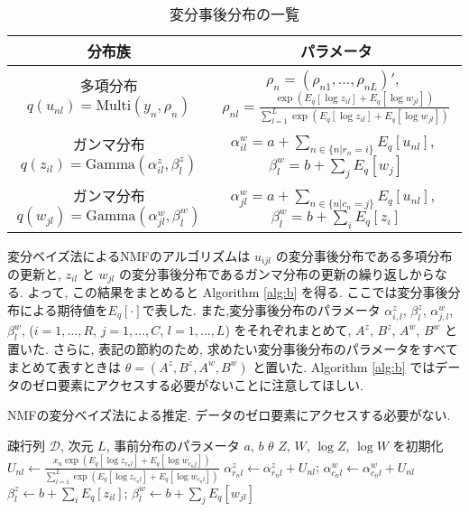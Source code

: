 \documentclass[paper=a4,10.5pt]{jsarticle} %
\numberwithin{equation}{section} %
\begin{document}
\renewcommand{\arraystretch}{1.6}
\begin{table}
\centering
\caption{変分事後分布の一覧} \label{post1}
\begin{tabular}{cc}
\hline
分布族 & パラメータ\\
\hline
多項分布 $q(u_{nl}) = \mathrm{Multi}(y_n, \rho_n)$ & $\rho_n = (\rho_{n1},\dots, \rho_{nL})'$,~ $\displaystyle \rho_{nl} = \frac{\exp(E_q[\log z_{il}] + E_q[\log w_{jl}] )}{ \sum_{l=1}^L \exp(E_q[\log z_{il}] + E_q[\log w_{jl}] )}$\\
ガンマ分布 $q(z_{il}) = \mathrm{Gamma}(\alpha^z_{il}, \beta^z_l)$ & $\displaystyle \alpha^w_{il}=a+\sum_{n \in \{n|r_n=i\}} E_q[u_{nl}]$,~ $\displaystyle \beta^w_{l} = b+\sum_j E_q[w_j]$\\
ガンマ分布 $q(w_{jl}) = \mathrm{Gamma}(\alpha^w_{jl}, \beta^w_{l})$ & $\displaystyle \alpha^w_{jl}=a+\sum_{n \in \{n|c_n=j\}} E_q[u_{nl}]$,~ $\displaystyle \beta^w_{l} = b+\sum_i E_q[z_i]$ \\
\hline
\end{tabular}
\end{table}
\renewcommand{\arraystretch}{1}

変分ベイズ法によるNMFのアルゴリズムは $u_{ijl}$ の変分事後分布である多項分布の更新と, $z_{il}$ と $w_{jl}$ の変分事後分布であるガンマ分布の更新の繰り返しからなる. よって, この結果をまとめると Algorithm \ref{alg:b} を得る. ここでは変分事後分布による期待値を$E_q[\cdot]$で表した. また,変分事後分布のパラメータ $\alpha^z_{i,l}$, $\beta^z_{l}$, $\alpha^w_{j,l}$, $\beta^w_{l}$, ($i=1,\ldots, R$, $j=1,\ldots, C$, $l=1, \ldots ,L$) をそれぞれまとめて, $A^z$, $B^z$, $A^w$, $B^w$ と置いた. さらに, 表記の節約のため, 求めたい変分事後分布のパラメータをすべてまとめて表すときは $\theta = (A^z, B^z, A^w, B^w)$ と置いた. Algorithm \ref{alg:b} ではデータのゼロ要素にアクセスする必要がないことに注意してほしい.

\begin{algorithm}[tbp]
\caption{NMFの変分ベイズ法による推定. データのゼロ要素にアクセスする必要がない. }\label{alg:b}
\begin{algorithmic}
\Require 疎行列 $\mathcal{D}$, 次元 $L$, 事前分布のパラメータ $a$, $b$
\Ensure $\theta$ 
\State $Z$, $W$, $\log Z$, $\log W$ を初期化  
 
    \State $\displaystyle U_{nl} \leftarrow  \frac{x_n \exp(E_q[\log z_{r_nl}] + E_q[ \log w_{c_n j}] )}{ \sum_{l=1}^L \exp(E_q[\log z_{r_nl}]+E_q[\log w_{c_n l}] )}$  
    \State $\alpha^z_{r_n l}  \leftarrow \alpha^z_{r_nl} + U_{nl}$;  $\alpha^w_{c_n l} \leftarrow  \alpha^w_{c_n l}+ U_{nl}$ 
\EndFor
    \EndFor
    \State $\beta^z_{l}  \leftarrow  b +  \sum_i E_q[z_{il}]$; $\beta^w_{l}  \leftarrow b + \sum_j E_q[w_{jl}]$
        \EndFor
\EndWhile
\end{algorithmic}
\end{algorithm}
\end{document}

